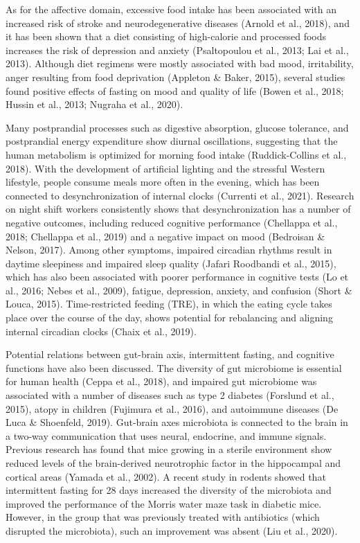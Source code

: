 \documentclass[authordate, empirical,issue]{jote-new-article}
\begin{document}
As for the affective domain, excessive food intake has been associated with an increased risk of stroke and neurodegenerative diseases (Arnold et al., 2018), and it has been shown that a diet consisting of high-calorie and processed foods increases the risk of depression and anxiety (Psaltopoulou et al., 2013; Lai et al., 2013). Although diet regimens were mostly associated with bad mood, irritability, anger resulting from food deprivation (Appleton \& Baker, 2015), several studies found positive effects of fasting on mood and quality of life (Bowen et al., 2018; Hussin et al., 2013; Nugraha et al., 2020).



Many postprandial processes such as digestive absorption, glucose tolerance, and postprandial energy expenditure show diurnal oscillations, suggesting that the human metabolism is optimized for morning food intake (Ruddick-Collins et al., 2018). With the development of artificial lighting and the stressful Western lifestyle, people consume meals more often in the evening, which has been connected to desynchronization of internal clocks (Currenti et al., 2021). Research on night shift workers consistently shows that desynchronization has a number of negative outcomes, including reduced cognitive performance (Chellappa et al., 2018; Chellappa et al., 2019) and a negative impact on mood (Bedroisan \& Nelson, 2017). Among other symptoms, impaired circadian rhythms result in daytime sleepiness and impaired sleep quality (Jafari Roodbandi et al., 2015), which has also been associated with poorer performance in cognitive tests (Lo et al., 2016; Nebes et al., 2009), fatigue, depression, anxiety, and confusion (Short \& Louca, 2015). Time-restricted feeding (TRE), in which the eating cycle takes place over the course of the day, shows potential for rebalancing and aligning internal circadian clocks (Chaix et al., 2019).



Potential relations between gut-brain axis, intermittent fasting, and cognitive functions have also been discussed. The diversity of gut microbiome is essential for human health (Ceppa et al., 2018), and impaired gut microbiome was associated with a number of diseases such as type 2 diabetes (Forslund et al., 2015), atopy in children (Fujimura et al., 2016), and autoimmune diseases (De Luca \& Shoenfeld, 2019). Gut-brain axes microbiota is connected to the brain in a two-way communication that uses neural, endocrine, and immune signals. Previous research has found that mice growing in a sterile environment show reduced levels of the brain-derived neurotrophic factor in the hippocampal and cortical areas (Yamada et al., 2002). A recent study in rodents showed that intermittent fasting for 28 days increased the diversity of the microbiota and improved the performance of the Morris water maze task in diabetic mice. However, in the group that was previously treated with antibiotics (which disrupted the microbiota), such an improvement was absent (Liu et al., 2020).
\end{document}
